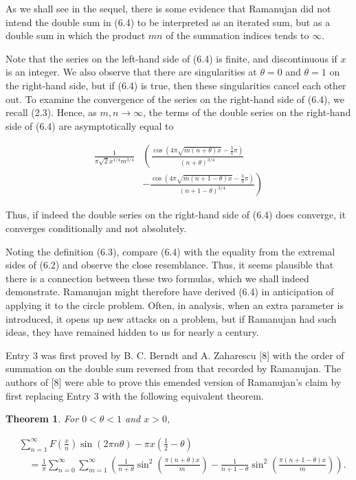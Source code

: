 \documentclass[10pt]{article}
\theoremstyle{plain}
\newtheorem{theorem}{Theorem}
\begin{document}
As we shall see in the sequel, there is some evidence that Ramanujan did not intend the double sum in (6.4) to be interpreted as an iterated sum, but as a double sum in which the product $mn$ of the summation indices tends to $\infty$.

Note that the series on the left-hand side of (6.4) is finite, and discontinuous if $x$ is an integer. We also observe that there are singularities at $\theta=0$ and $\theta=1$ on the right-hand side, but if (6.4) is true, then these singularities cancel each other out. To examine the convergence of the series on the right-hand side of (6.4), we recall (2.3). Hence, as $m, n \to \infty$, the terms of the double series on the right-hand side of (6.4) are asymptotically equal to

$$
\begin{aligned}
\frac{1}{\pi \sqrt{2} x^{1 / 4} m^{3 / 4}} & \left(\frac{\cos \left(4 \pi \sqrt{m(n+\theta) x}-\frac{3}{4} \pi\right)}{(n+\theta)^{3 / 4}}\right. \\
& \left.-\frac{\cos \left(4 \pi \sqrt{m(n+1-\theta) x}-\frac{3}{4} \pi\right)}{(n+1-\theta)^{3 / 4}}\right)
\end{aligned}
$$

Thus, if indeed the double series on the right-hand side of (6.4) does converge, it converges conditionally and not absolutely.

Noting the definition (6.3), compare (6.4) with the equality from the extremal sides of (6.2) and observe the close resemblance. Thus, it seems plausible that there is a connection between these two formulas, which we shall indeed demonstrate. Ramanujan might therefore have derived (6.4) in anticipation of applying it to the circle problem. Often, in analysis, when an extra parameter is introduced, it opens up new attacks on a problem, but if Ramanujan had such ideas, they have remained hidden to us for nearly a century.

Entry 3 was first proved by B. C. Berndt and A. Zaharescu [8] with the order of summation on the double sum reversed from that recorded by Ramanujan. The authors of [8] were able to prove this emended version of Ramanujan's claim by first replacing Entry 3 with the following equivalent theorem.

\begin{theorem}
For $0<\theta<1$ and $x>0$,


\begin{align*}
& \sum_{n=1}^{\infty} F\left(\frac{x}{n}\right) \sin (2 \pi n \theta)-\pi x\left(\frac{1}{2}-\theta\right) \\
& \quad=\frac{1}{\pi} \sum_{n=0}^{\infty} \sum_{m=1}^{\infty}\left(\frac{1}{n+\theta} \sin ^{2}\left(\frac{\pi(n+\theta) x}{m}\right)-\frac{1}{n+1-\theta} \sin ^{2}\left(\frac{\pi(n+1-\theta) x}{m}\right)\right) . \tag{6.5}
\end{align*}
\end{theorem}
\end{document}
